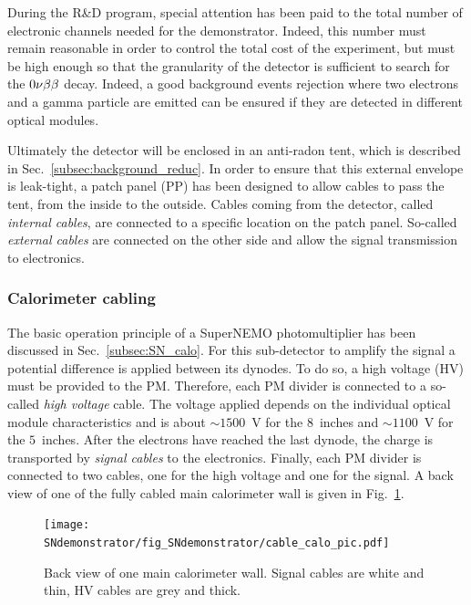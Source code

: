 During the R\&D program, special attention has been paid to the total number of electronic channels needed for the demonstrator.
Indeed, this number must remain reasonable in order to control the total cost of the experiment, but must be high enough so that the granularity of the detector is sufficient to search for the $0\nu\beta\beta$ decay.
Indeed, a good background events rejection where two electrons and a gamma particle are emitted can be ensured if they are detected in different optical modules.

Ultimately the detector will be enclosed in an anti-radon tent, which is described in Sec.~\ref{subsec:background_reduc}.
In order to ensure that this external envelope is leak-tight, a patch panel (PP) has been designed to allow cables to pass the tent, from the inside to the outside.
Cables coming from the detector, called \emph{internal cables}, are connected to a specific location on the patch panel.
So-called \emph{external cables} are connected on the other side and allow the signal transmission to electronics.

\subsubsection*{Calorimeter cabling}

The basic operation principle of a SuperNEMO photomultiplier has been discussed in Sec.~\ref{subsec:SN_calo}.
For this sub-detector to amplify the signal a potential difference is applied between its dynodes.
To do so, a high voltage (HV) must be provided to the PM.
Therefore, each PM divider is connected to a so-called \emph{high voltage} cable.
The voltage applied depends on the individual optical module characteristics and is about $\sim1500$~V for the $8$~inches and $\sim1100$~V for the $5$~inches.
After the electrons have reached the last dynode, the charge is transported by \emph{signal cables} to the electronics.
Finally, each PM divider is connected to two cables, one for the high voltage and one for the signal.
A back view of one of the fully cabled main calorimeter wall is given in Fig.~\ref{fig:calo_cabling_pic}.
\begin{figure}[h]
  \centering
  \texttt{[image: SNdemonstrator/fig\_SNdemonstrator/cable\_calo\_pic.pdf]}
  \caption{Back view of one main calorimeter wall.
    Signal cables are white and thin, HV cables are grey and thick.
    \label{fig:calo_cabling_pic}}
\end{figure}

